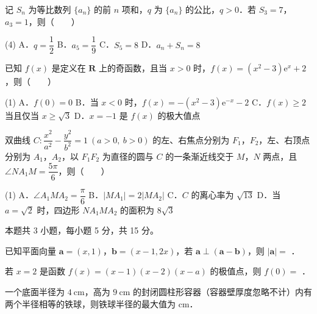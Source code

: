 \begin{question}
记 $S_n$ 为等比数列 $\{a_n\}$ 的前 $n$ 项和，$q$ 为 $\{a_n\}$ 的公比，$q>0$．若 $S_3=7$，$a_3=1$，则\mbox{（　　）}

\begin{gkopts}(4)
\task A．$q=\dfrac12$
\task B．$a_5=\dfrac19$
\task C．$S_5=8$
\task D．$a_n+S_n=8$
\end{gkopts}

\end{question}
\begin{question}
已知 $f(x)$ 是定义在 $\mathbf{R}$ 上的奇函数，且当 $x>0$ 时，$f(x)=\left(x^2-3\right)\mathrm{e}^{x}+2$，则\mbox{（　　）}

\begin{gkopts}(1)
\task A．$f(0)=0$
\task B．当 $x<0$ 时，$f(x)=-\left(x^2-3\right)\mathrm{e}^{-x}-2$
\task C．$f(x)\ge 2$ 当且仅当 $x\ge\sqrt3$
\task D．$x=-1$ 是 $f(x)$ 的极大值点
\end{gkopts}

\end{question}
\begin{question}
双曲线 $C:\dfrac{x^2}{a^2}-\dfrac{y^2}{b^2}=1\ (a>0,\ b>0)$ 的左、右焦点分别为 $F_1$，$F_2$，左、右顶点分别为 $A_1$，$A_2$，以 $F_1F_2$ 为直径的圆与 $C$ 的一条渐近线交于 $M$，$N$ 两点，且 $\angle NA_1M=\dfrac{5\pi}{6}$，则\mbox{（　　）}

\begin{gkopts}(1)
\task A．$\angle A_1MA_2=\dfrac{\pi}{6}$
\task B．$|MA_1|=2|MA_2|$
\task C．$C$ 的离心率为 $\sqrt{13}$
\task D．当 $a=\sqrt2$ 时，四边形 $NA_1MA_2$ 的面积为 $8\sqrt3$
\end{gkopts}

\par\medskip

\end{question}

\begin{gktip}
本题共 3 小题，每小题 5 分，共 15 分。
\end{gktip}

\begin{question}
已知平面向量 $\boldsymbol{a}=(x,1)$，$\boldsymbol{b}=(x-1,2x)$，若 $\boldsymbol{a}\perp(\boldsymbol{a}-\boldsymbol{b})$，则 $|\boldsymbol{a}|=$ \gkblank{}．

\end{question}
\begin{question}
若 $x=2$ 是函数 $f(x)=(x-1)(x-2)(x-a)$ 的极值点，则 $f(0)=$ \gkblank{}．

\end{question}
\begin{question}
一个底面半径为 $4\ \mathrm{cm}$，高为 $9\ \mathrm{cm}$ 的封闭圆柱形容器（容器壁厚度忽略不计）内有两个半径相等的铁球，则铁球半径的最大值为 \gkblank{} $\mathrm{cm}$．

\par\medskip

\end{question}

